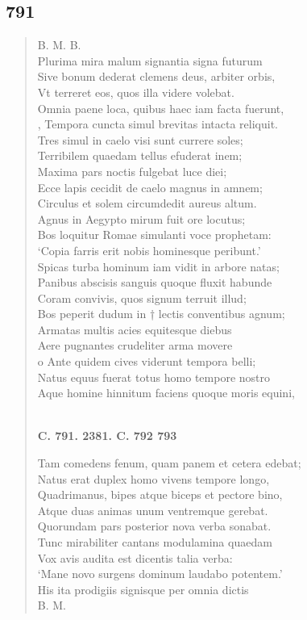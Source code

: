 \documentclass[11pt, a4paper]{report}
\begin{document}
            \subsection*{791}
      \begin{verse}
      B. M. B. \\ Plurima mira malum signantia signa futurum \\ Sive bonum dederat clemens deus, arbiter orbis, \\ Vt terreret eos, quos illa videre volebat. \\ Omnia paene loca, quibus haec iam facta fuerunt, \\ , Tempora cuncta simul brevitas intacta reliquit. \\ Tres simul in caelo visi sunt currere soles; \\ Terribilem quaedam tellus efuderat inem; \\ Maxima pars noctis fulgebat luce diei; \\ Ecce lapis cecidit de caelo magnus in amnem; \\ Circulus et solem circumdedit aureus altum. \\ Agnus in Aegypto mirum fuit ore locutus; \\ Bos loquitur Romae simulanti voce prophetam: \\ ‘Copia farris erit nobis hominesque peribunt.’ \\ Spicas turba hominum iam vidit in arbore natas; \\ Panibus abscisis sanguis quoque fluxit habunde \\ Coram convivis, quos signum terruit illud; \\ Bos peperit dudum in † lectis conventibus agnum; \\ Armatas multis acies equitesque diebus \\ Aere pugnantes crudeliter arma movere \\ o Ante quidem cives viderunt tempora belli; \\ Natus equus fuerat totus homo tempore nostro \\ Aque homine hinnitum faciens quoque moris equini, \\ 
        ﻿\pagebreak 
    \begin{center} \textbf{C. 791. 2381. C. 792 793} \end{center} \marginpar{[270]} Tam comedens fenum, quam panem et cetera edebat; \\ Natus erat duplex homo vivens tempore longo, \\ Quadrimanus, bipes atque biceps et pectore bino, \\ Atque duas animas unum ventremque gerebat. \\ Quorundam pars posterior nova verba sonabat. \\ Tunc mirabiliter cantans modulamina quaedam \\ Vox avis audita est dicentis talia verba: \\ ‘Mane novo surgens dominum laudabo potentem.’ \\ His ita prodigiis signisque per omnia dictis \\ B. M. \\ 
      \end{verse}
  
\end{document}

